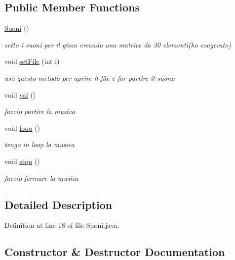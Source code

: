 \subsection*{Public Member Functions}
\begin{DoxyCompactItemize}
\item 
\hyperlink{classa_1_1survival_1_1game_1_1_suoni_a4d6dbc6009f807d60bfc4b3d3949cd8f}{Suoni} ()
\begin{DoxyCompactList}\small\item\em setto i suoni per il gioco creando una matrice da 30 elementi(ho esagerato) \end{DoxyCompactList}\item 
void \hyperlink{classa_1_1survival_1_1game_1_1_suoni_ae823b8f4c288feca83157a7622d42652}{set\+File} (int i)
\begin{DoxyCompactList}\small\item\em uso questo metodo per aprire il file e far partire il suono \end{DoxyCompactList}\item 
void \hyperlink{classa_1_1survival_1_1game_1_1_suoni_ac738b68e43ea05bba3f9e9b8e020426f}{vai} ()
\begin{DoxyCompactList}\small\item\em faccio partire la musica \end{DoxyCompactList}\item 
void \hyperlink{classa_1_1survival_1_1game_1_1_suoni_afe461d27b9c48d5921c00d521181f12f}{loop} ()
\begin{DoxyCompactList}\small\item\em tengo in loop la musica \end{DoxyCompactList}\item 
void \hyperlink{classa_1_1survival_1_1game_1_1_suoni_a8c528baf37154d347366083f0f816846}{stop} ()
\begin{DoxyCompactList}\small\item\em faccio fermare la musica \end{DoxyCompactList}\end{DoxyCompactItemize}


\subsection{Detailed Description}


Definition at line 18 of file Suoni.\+java.



\subsection{Constructor \& Destructor Documentation}
\mbox{\label{classa_1_1survival_1_1game_1_1_suoni_a4d6dbc6009f807d60bfc4b3d3949cd8f}} 
